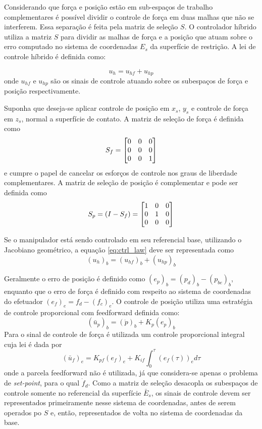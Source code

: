 Considerando que força e posição estão em sub-espaços de trabalho complementares é possível dividir o controle de força em duas malhas que não se interferem. Essa separação é feita pela matriz de seleção ${S}$. O controlador híbrido utiliza a matriz ${S}$ para dividir as malhas de  força e a posição  que atuam sobre o erro computado no sistema de coordenadas ${E}_s$ da superfície de restrição. A lei de controle híbrido é definida como:

\begin{equation} \label{eq:ctrl_law}
{u}_h = {u}_{hf} + {u}_{hp}
\end{equation}
onde $u_{hf}$ e $u_{hp}$ são os sinais de controle atuando sobre os subespaços de força e posição respectivamente. 

Suponha que deseja-se aplicar controle de posição em $x_s$, $y_s$ e controle de força em $z_s$, normal a superfície de contato. A matriz de seleção de força é definida como
\begin{equation}
S_f = \begin{bmatrix}
    0 & 0 & 0 \\
    0 & 0 & 0 \\
    0 & 0 & 1 
\end{bmatrix}
\end{equation}
e cumpre o papel de cancelar os esforços de controle nos graus de liberdade complementares. A matriz de seleção de posição é complementar e pode ser definida como
\begin{equation}
S_p = (I - S_f) = \begin{bmatrix}
    1 & 0 & 0 \\
    0 & 1 & 0 \\
    0 & 0 & 0 
\end{bmatrix}
\end{equation}

Se o manipulador está sendo controlado em seu referencial base, utilizando o Jacobiano geométrico, a equação \eqref{eq:ctrl_law} deve ser representada como 
\begin{equation}
({u}_h)_b = ({u}_{hf})_b + ({u}_{hp})_b
\end{equation}

Geralmente o erro de posição é definido como $(e_p)_b = (p_d)_b - (p_{be})_b$, enquanto que o erro de força é definido com respeito ao sistema de coordenadas do efetuador  $(e_f)_e = f_d - (f_{c})_e$. O controle de posição utiliza uma estratégia de controle proporcional com feedforward definida como:
\begin{equation}
(\bar{u}_p)_b = (\dot{p})_b + K_{p} (e_p)_b
\end{equation}
Para o sinal de controle de força é utilizada um controle proporcional integral cuja lei é dada por 
\begin{equation}
(\bar{u}_f)_e = K_{pf} (e_f)_e + K_{if} \int^{\tau}_0 (e_f(\tau))_e d\tau
\end{equation}
onde a parcela feedforward não é utilizada, já que considera-se apenas o problema de \textit{set-point}, para o qual $\dot{f}_d$. Como a matriz de seleção desacopla os subespaços de controle somente no referencial da superfície $\bar{E}_s$, os sinais de controle devem ser representados primeiramente nesse sistema de coordenadas, antes de serem operados po $S$ e, então, representados de volta no sistema de coordenadas da base.


